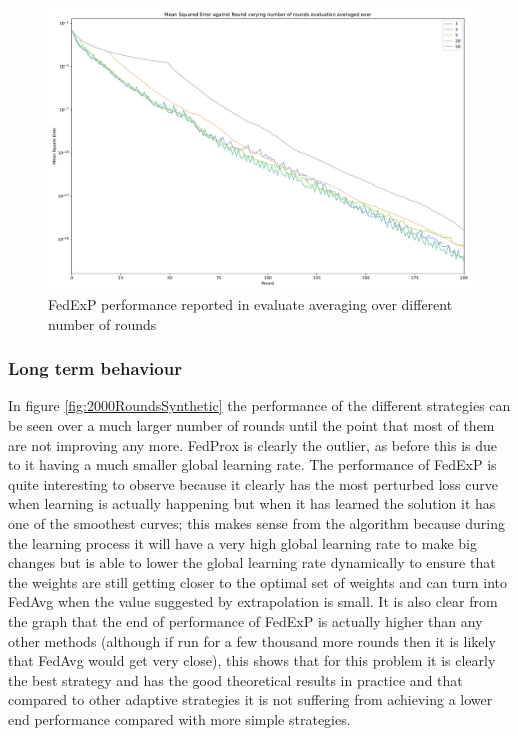 \documentclass{article}
\begin{document}
\begin{figure}
    \centerline{\includegraphics[width=.6\linewidth]{figs/synthetic_numberOfRoundsAverageEvaluate.pdf}}
    \caption{FedExP performance reported in evaluate averaging over different number of rounds}
    \label{fig:differentNumberOfAverageEvaluateRoundsSynthetic}
\end{figure}

\subsubsection{Long term behaviour}

In figure \ref{fig:2000RoundsSynthetic} the performance of the different strategies can be seen over a much larger number of rounds until the point that most of them are not improving any more.  FedProx is clearly the outlier, as before this is due to it having a much smaller global learning rate.  The performance of FedExP is quite interesting to observe because it clearly has the most perturbed loss curve when learning is actually happening but when it has learned the solution it has one of the smoothest curves; this makes sense from the algorithm because during the learning process it will have a very high global learning rate to make big changes but is able to lower the global learning rate dynamically to ensure that the weights are still getting closer to the optimal set of weights and can turn into FedAvg when the value suggested by extrapolation is small.  It is also clear from the graph that the end of performance of FedExP is actually higher than any other methods (although if run for a few thousand more rounds then it is likely that FedAvg would get very close), this shows that for this problem it is clearly the best strategy and has the good theoretical results in practice and that compared to other adaptive strategies it is not suffering from achieving a lower end performance compared with more simple strategies.
\end{document}
